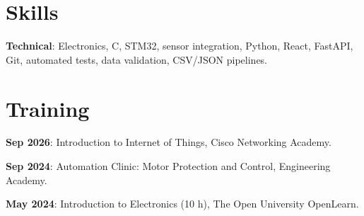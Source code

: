 \documentclass[11pt,a4paper]{article}
\newcommand{\cvitem}[2]{\textbf{#1}: #2\par}
\begin{document}
\section{Skills}
\cvitem{Technical}{Electronics, C, STM32, sensor integration, Python, React, FastAPI, Git, automated tests, data validation, CSV/JSON pipelines.}
\section{Training}
\cvitem{Sep 2026}{Introduction to Internet of Things, Cisco Networking Academy.}
\cvitem{Sep 2024}{Automation Clinic: Motor Protection and Control, Engineering Academy.}
\cvitem{May 2024}{Introduction to Electronics (10 h), The Open University OpenLearn.}
\end{document}
